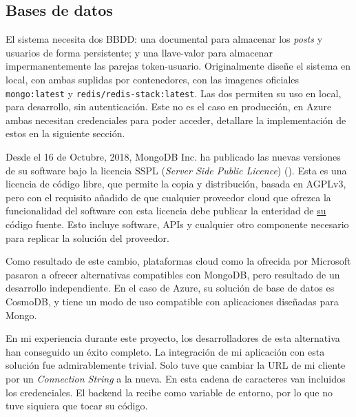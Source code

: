 \documentclass[11pt]{article}
\begin{document}
\begin{flushleft}
	\clearpage
	\subsection{Bases de datos}
	El sistema necesita dos BBDD: una documental para almacenar los \textit{posts} y usuarios de forma persistente; y una llave-valor para almacenar impermanentemente las parejas token-usuario. Originalmente diseñe el sistema en local, con ambas suplidas por contenedores, con las imagenes oficiales \texttt{mongo:latest} y \texttt{redis/redis-stack:latest}. Las dos permiten su uso en local, para desarrollo, sin autenticación. Este no es el caso en producción, en Azure ambas necesitan credenciales para poder acceder, detallare la implementación de estos en la siguiente sección.
	\linebreak
	
	Desde el 16 de Octubre, 2018, MongoDB Inc. ha publicado las nuevas versiones de su software bajo la licencia SSPL (\textit{Server Side Public Licence}) (\cite{mongo_sspl}). Esta es una licencia de código libre, que permite la copia y distribución, basada en AGPLv3, pero con el requisito añadido de que cualquier proveedor cloud que ofrezca la funcionalidad del software con esta licencia debe publicar la enteridad de \underline{su} código fuente. Esto incluye software, APIs y cualquier otro componente necesario para replicar la solución del proveedor. 
	\linebreak
	
	Como resultado de este cambio, plataformas cloud como la ofrecida por Microsoft pasaron a ofrecer alternativas compatibles con MongoDB, pero resultado de un desarrollo independiente. En el caso de Azure, su solución de base de datos es CosmoDB, y tiene un modo de uso compatible con aplicaciones diseñadas para Mongo. 
	\linebreak
	
	En mi experiencia durante este proyecto, los desarrolladores de esta alternativa han conseguido un éxito completo. La integración de mi aplicación con esta solución fue admirablemente trivial. Solo tuve que cambiar la URL de mi cliente por un \textit{Connection String} a la nueva. En esta cadena de caracteres van incluidos los credenciales. El backend la recibe como variable de entorno, por lo que no tuve siquiera que tocar su código.
	\linebreak
	

\end{flushleft}
\end{document}

